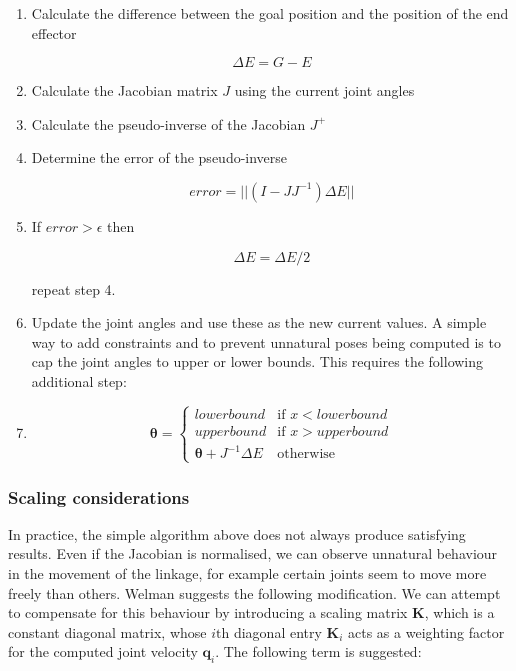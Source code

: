 \documentclass[paper=a4, fontsize=11pt]{scrartcl} %
\numberwithin{equation}{section} %
\numberwithin{figure}{section} %
\numberwithin{table}{section} %
\newcommand{\vect}[1]{\mathbf{#1}}
\newcommand{\params}{\boldsymbol{\theta}}
\begin{document}
\begin{enumerate}
\item
Calculate the difference between the goal position and the position of the end effector

\begin{equation}
\Delta E = G - E
\end{equation}

\item
Calculate the Jacobian matrix $J$ using the current joint angles

\item
Calculate the pseudo-inverse of the Jacobian $J^+$

\item
Determine the error of the pseudo-inverse

\begin{equation}
error = ||(I - JJ^{-1})\Delta E||
\end{equation}

\item
If $error > \epsilon$ then

\begin{equation}
\Delta E = \Delta E / 2
\end{equation}  

repeat step 4.


\item
Update the joint angles and use these as the new current values.
A simple way to add constraints and to prevent unnatural poses being computed is to cap the joint angles to upper or lower bounds. This requires the following additional step:

\item
\begin{equation*}
\params = \left\{
\begin{array}{rl}
lowerbound & \text{if } x < lowerbound\\
upperbound & \text{if } x > upperbound\\
\params + J^{-1}\Delta E & \text{otherwise}
\end{array} \right.
\end{equation*}

\end{enumerate}

\subsubsection{Scaling considerations}

In practice, the simple algorithm above does not always produce satisfying results. Even if the Jacobian is normalised, we can observe unnatural behaviour in the movement of the linkage, for example certain joints seem to move more freely than others. Welman suggests the following modification. We can attempt to compensate for this behaviour by introducing a scaling matrix $\vect{K}$, which is a constant diagonal matrix, whose $i \text{th}$ diagonal entry $\vect{K}_i$ acts as a weighting factor for the computed joint velocity $\vect{q}_i$. The following term is suggested:
\end{document}
